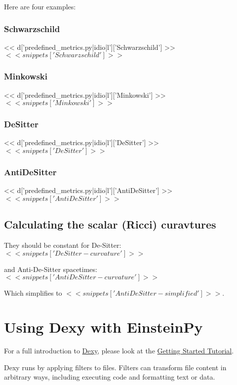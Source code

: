 \documentclass[%
 reprint,
 amsmath,amssymb,
 aps,
]{revtex4-1}
\begin{document}
Here are four examples:

\subsubsection{\label{sec:level3}Schwarzschild}
<< d['predefined_metrics.py|idio|l']['Schwarzschild'] >>
$<< snippets['Schwarzschild'] >>$

\subsubsection{\label{sec:level3}Minkowski}
<< d['predefined_metrics.py|idio|l']['Minkowski'] >>
$<< snippets['Minkowski'] >>$

\subsubsection{\label{sec:level3}DeSitter}
<< d['predefined_metrics.py|idio|l']['DeSitter'] >>
$<< snippets['DeSitter'] >>$

\subsubsection{\label{sec:level3}AntiDeSitter}
<< d['predefined_metrics.py|idio|l']['AntiDeSitter'] >>
$<< snippets['AntiDeSitter'] >>$

\subsection{\label{sec:level2}Calculating the scalar (Ricci) curavtures}


They should be constant for De-Sitter:
$<< snippets['DeSitter-curvature'] >>$

and Anti-De-Sitter spacetimes: \\
$<< snippets['AntiDeSitter-curvature'] >>$

Which simplifies to $<< snippets['AntiDeSitter-simplified'] >>$.


\section{\label{sec:level1}Using Dexy with EinsteinPy}

For a full introduction to \href{http://www.dexy.it/}{Dexy}, please look at the \href{http://www.dexy.it/docs/getting-started.html}{Getting Started Tutorial}.

Dexy runs by applying filters to files. Filters can transform file content in
arbitrary ways, including executing code and formatting text or data.
\end{document}
